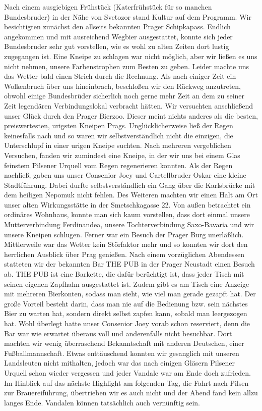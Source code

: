\begin{multicols}{2}
Nach einem ausgiebigen Frühstück (Katerfrühstück für so manchen Bundesbruder) in der Nähe von Svetozor stand Kultur auf dem Programm. Wir besichtigten zunächst den allseits bekannten Prager Schipkapass. Endlich angekommen und mit ausreichend Wegbier ausgestattet, konnte sich jeder Bundesbruder sehr gut vorstellen, wie es wohl zu alten Zeiten dort lustig zugegangen ist. Eine Kneipe zu schlagen war nicht möglich, aber wir ließen es uns nicht nehmen, unsere Farbenstrophen zum Besten zu geben. Leider machte uns das Wetter bald einen Strich durch die Rechnung. Als nach einiger Zeit ein Wolkenbruch über uns hineinbrach, beschloßen wir den Rückweg anzutreten, obwohl einige Bundesbrüder sicherlich noch gerne mehr Zeit an dem zu seiner Zeit legendären Verbindungslokal verbracht hätten. Wir versuchten anschließend unser Glück durch den Prager Bierzoo. Dieser meint nichts anderes als die besten, preiswertesten, urigsten Kneipen Prags. Unglücklicherweise ließ der Regen keinesfalls nach und so waren wir selbstverständlich nicht die einzigen, die Unterschlupf in einer urigen Kneipe suchten. Nach mehreren vergeblichen Versuchen, fanden wir zumindest eine Kneipe, in der wir uns bei einem Glas feinstem Pilsener Urquell vom Regen regenerieren konnten. Als der Regen nachließ, gaben uns unser Consenior Joey und Cartellbruder Oskar eine kleine Stadtführung. Dabei durfte selbstverständlich ein Gang über die Karlsbrücke mit dem heiligen Nepomuk nicht fehlen. Des Weiteren machten wir einen Halt am Ort unser alten Wirkungsstätte in der Smetschkagasse 22. Von außen betrachtet ein ordinäres Wohnhaus, konnte man sich kaum vorstellen, dass dort einmal unsere Mutterverbindung Ferdinandea, unsere Tochterverbindung Saxo-Bavaria und wir unsere
Kneipen schlugen. Ferner war ein Besuch der Prager Burg unerläßlich. Mittlerweile war das Wetter kein Störfaktor mehr und so konnten wir dort den herrlichen Ausblick über Prag genießen. Nach einem vorzüglichen Abendessen statteten wir der bekannten Bar THE PUB in der Prager Neustadt einen Besuch ab. THE PUB ist eine Barkette, die dafür berüchtigt ist, dass jeder Tisch mit seinen eigenen Zapfhahn ausgestattet ist. Zudem gibt es am Tisch eine Anzeige mit mehreren Bierkonten, sodass man sieht, wie viel man gerade gezapft hat. Der große Vorteil besteht darin, dass man nie auf die Bedienung bzw. sein nächstes Bier zu warten hat, sondern direkt selbst zapfen kann, sobald man leergezogen hat. Wohl überlegt hatte unser Consenior Joey vorab schon reserviert, denn die Bar war wie erwartet überaus voll und anderenfalls nicht besuchbar. Dort machten wir wenig überraschend Bekanntschaft mit anderen Deutschen, einer Fußballmannschaft. Etwas enttäuschend konnten wir gesanglich mit unseren Landsleuten nicht mithalten, jedoch war das nach einigen Gläsern Pilsener Urquell schon wieder vergessen und jeder Vandale war am Ende doch zufrieden. Im Hinblick auf das nächste Highlight am folgenden Tag, die Fahrt nach Pilsen zur Brauereiführung, übertrieben wir es auch nicht und der Abend fand kein allzu langes Ende. Vandalen können tatsächlich auch vernünftig sein.\\

\end{multicols}

